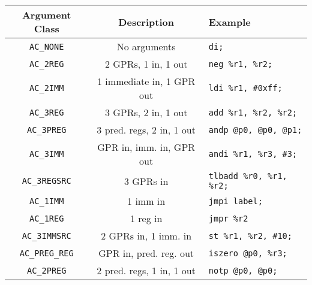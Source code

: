 \documentclass[10pt,letterpaper]{article}
\begin{document}
\begin{center}
\begin{tabular}{c|c|l}
\textbf{Argument Class}&\textbf{Description}&\textbf{Example}\\
\hline
\texttt{AC\_NONE}    &No arguments             &\texttt{di;}                 \\
\texttt{AC\_2REG}    &2 GPRs, 1 in, 1 out      &\texttt{neg    \%r1, \%r2;}  \\
\texttt{AC\_2IMM}    &1 immediate in, 1 GPR out&\texttt{ldi    \%r1, \#0xff;}\\
\texttt{AC\_3REG}    &3 GPRs, 2 in, 1 out  &\texttt{add    \%r1, \%r2, \%r2;}\\
\texttt{AC\_3PREG}   &3 pred. regs, 2 in, 1 out&\texttt{andp   @p0, @p0, @p1;}\\
\texttt{AC\_3IMM} &GPR in, imm. in, GPR out &\texttt{andi   \%r1, \%r3, \#3;}\\
\texttt{AC\_3REGSRC} &3 GPRs in            &\texttt{tlbadd \%r0, \%r1, \%r2;}\\
\texttt{AC\_1IMM}    &1 imm in             &\texttt{jmpi   label;}          \\
\texttt{AC\_1REG}    &1 reg in             &\texttt{jmpr   \%r2}            \\
\texttt{AC\_3IMMSRC} &2 GPRs in, 1 imm. in &\texttt{st     \%r1, \%r2, \#10;}\\
\texttt{AC\_PREG\_REG}&GPR in, pred. reg. out &\texttt{iszero @p0, \%r3;}    \\
\texttt{AC\_2PREG}   &2 pred. regs, 1 in, 1 out&\texttt{notp   @p0, @p0;}    \\
\end{tabular}
\end{center}
\end{document}

